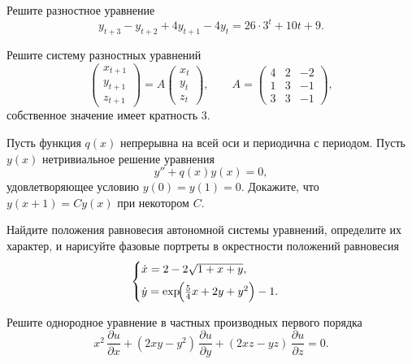 \documentclass[12pt]{article}
\begin{document}

\begin{examproblems}
\item Решите разностное уравнение
\[
y_{t+3}-y_{t+2}+4y_{t+1}-4y_{t} = 26 \cdot 3^{t} + 10t + 9.
\]

\item Решите систему разностных уравнений
\[
\begin{pmatrix}
x_{t+1}\\[2pt]
y_{t+1}\\[2pt]
z_{t+1}
\end{pmatrix}
=
A
\begin{pmatrix}
x_{t}\\[2pt]
y_{t}\\[2pt]
z_{t}
\end{pmatrix},
\qquad
A=
\begin{pmatrix}
4 & 2 & -2\\
1 & 3 & -1\\
3 & 3 & -1
\end{pmatrix},
\]
собственное значение имеет кратность $3$.

\item Пусть функция $q(x)$ непрерывна на всей оси и периодична с периодом. Пусть $y(x)$ нетривиальное решение уравнения
\[
y'' + q(x)y(x)=0,
\]
удовлетворяющее условию $y(0)=y(1)=0$. Докажите, что $y(x+1)=Cy(x)$ при некотором $C$.

\item Найдите положения равновесия автономной системы уравнений, определите их характер, и нарисуйте фазовые портреты в окрестности положений равновесия
\[
\begin{cases}
\dot{x}=2-2\sqrt{1+x+y},\\[4pt]
\dot{y}=\exp\!\Bigl(\tfrac{5}{4}x+2y+y^{2}\Bigr)-1.
\end{cases}
\]

\item Решите однородное уравнение в частных производных первого порядка
\[
x^{2}\,\frac{\partial u}{\partial x}
+(2xy-y^{2})\,\frac{\partial u}{\partial y}
+(2xz-yz)\,\frac{\partial u}{\partial z}=0.
\]
\end{examproblems}
\end{document}
